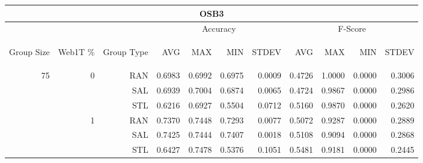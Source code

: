 \begin{center}
\begin{table}[htbp] 
 \begin{center}
\begin{tabular}{ | r | r | r | r | r | r | r | r | r | r | r |}
\hline
\multicolumn{11}{|c|}{OSB3}\\
\hline
 & & & \multicolumn{4}{|c|}{Accuracy} & \multicolumn{4}{|c|}{F-Score}\\ \cline{4-11}
\begin{sideways}Group Size\end{sideways} & \begin{sideways}Web1T \%\end{sideways} & \begin{sideways}Group Type\end{sideways} & \begin{sideways}AVG\end{sideways} & \begin{sideways}MAX\end{sideways} & \begin{sideways}MIN\end{sideways} & \begin{sideways}STDEV\end{sideways} & \begin{sideways}AVG\end{sideways} & \begin{sideways}MAX\end{sideways} & \begin{sideways}MIN\end{sideways} & \begin{sideways}STDEV\end{sideways}\\
\hline
\multirow{18}{*}{75}
 & \multirow{3}{*}{0} & RAN & 0.6983 & 0.6992 & 0.6975 & 0.0009 & 0.4726 & 1.0000 & 0.0000 & 0.3006\\ \cline{3-11}
 &   & SAL & 0.6939 & 0.7004 & 0.6874 & 0.0065 & 0.4724 & 0.9867 & 0.0000 & 0.2986\\ \cline{3-11}
 &   & STL & 0.6216 & 0.6927 & 0.5504 & 0.0712 & 0.5160 & 0.9870 & 0.0000 & 0.2620\\ \cline{2-11}
 & \multirow{3}{*}{1} & RAN & 0.7370 & 0.7448 & 0.7293 & 0.0077 & 0.5072 & 0.9287 & 0.0000 & 0.2889\\ \cline{3-11}
 &   & SAL & 0.7425 & 0.7444 & 0.7407 & 0.0018 & 0.5108 & 0.9094 & 0.0000 & 0.2868\\ \cline{3-11}
 &   & STL & 0.6427 & 0.7478 & 0.5376 & 0.1051 & 0.5481 & 0.9181 & 0.0000 & 0.2445\\ \cline{2-11}

\end{tabular}
\end{center}
\end{table}
\end{center}
